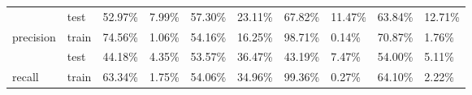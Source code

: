 \documentclass[a4paper, 12pt]{article}
\begin{document}
\begin{table}[b!]
{\begin{tabular}{@{}llllllllll@{}}
                                                & test  & 52.97\%                  & 7.99\%                  & 57.30\%                  & 23.11\%                 & \cellcolor[HTML]{C9E7BD}67.82\% & 11.47\%                 & 63.84\%                         & 12.71\%                 \\
                    \multirow{-2}{*}{precision} & train & 74.56\%                  & 1.06\%                  & 54.16\%                  & 16.25\%                 & 98.71\%                         & 0.14\%                  & 70.87\%                         & 1.76\%                  \\
                                                & test  & 44.18\%                  & 4.35\%                  & 53.57\%                  & 36.47\%                 & 43.19\%                         & 7.47\%                  & \cellcolor[HTML]{C9E7BD}54.00\% & 5.11\%                  \\
                    \multirow{-2}{*}{recall}    & train & 63.34\%                  & 1.75\%                  & 54.06\%                  & 34.96\%                 & 99.36\%                         & 0.27\%                  & 64.10\%                         & 2.22\%                  \\ \bottomrule
                \end{tabular}%
                }
                \label{tab:model_performance}
            \end{table}
\end{document}
